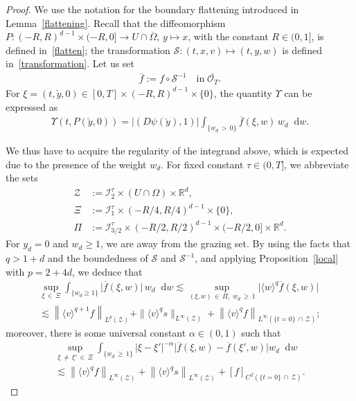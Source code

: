\documentclass[AHL,Unicode,longabstracts,published]{cedram}
\newcommand*{\dif}{\mathop{}\!\mathrm{d}}
\newcommand*\R {\mathbb{R}}
\newcommand*\I {\mathcal{I}}
\renewcommand*\SS {\mathcal{S}}
\newcommand*\Z {\mathcal{Z}}
\newcommand*\OO {\mathcal{O}}
\newcommand{\la}{\langle}
\newcommand{\ra}{\rangle}
\newcommand{\lv}{\langle v\rangle}
\begin{document}
\begin{proof}
We use the notation for the boundary flattening introduced in Lemma~\ref{flattening}. Recall that the diffeomorphism $P:(-R,R)^{d-1}\times(-R,0]\rightarrow U\cap\overline{\Omega}$, $y\mapsto x$, with the constant $R\in(0,1]$, is defined in~\eqref{flatten}; the transformation $\SS:(t,x,v)\mapsto(t,y,w)$ is defined in~\eqref{transformation}. Let us set
\begin{align*}
\overline{f}:=f\circ\SS^{-1} \quad\text{in}\; \overline{\OO_T}.
\end{align*}
For $\xi=(t,\check{y},0)\in [0,T]\times(-R,R)^{d-1}\times\{0\}$, the quantity $\Upsilon$ can be expressed as
\begin{align*}
\Upsilon(t,P(\check{y},0)) =|(D\psi(\check{y}),1)| \int_{\{w_d\,>\,0\}} \overline{f}(\xi,w)\, w_d \dif w.
\end{align*}

We thus have to acquire the regularity of the integrand above, which is expected due to the presence of the weight $w_d$. For fixed constant $\tau\in(0,T]$, we abbreviate the sets
\begin{align*}
\Z&:=\I_2^\tau\times(U\cap\Omega)\times\R^d,\\
\Xi&:=\I_1^\tau\times(-R/4,R/4)^{d-1}\times\{0\}, \\
\Pi&:=\I_{3/2}^\tau\times(-R/2,R/2)^{d-1}\times(-R/2,0]\times\R^d.
\end{align*}
For $y_d=0$ and $w_d\ge1$, we are away from the grazing set. By using the facts that $q>1+d$ and the boundedness of $\SS$ and $\SS^{-1}$, and applying Proposition~\ref{local} with $p=2+4d$, we deduce that
\begin{multline}\label{w10}
\sup_{\xi\,\in\,\Xi}\int_{\{w_d\ge1\}} \big|\overline{f}(\xi,w)\big|\, w_d \dif w
\lesssim \sup_{(\xi,w)\,\in\,\Pi,\;\! w_d\,\ge\,1}\big|\la w\ra^q\overline{f}(\xi,w)\big|\\
\lesssim \left\|\lv^{q+1}f\right\|_{L^p(\Z)} + \|\lv^{q}s\|_{L^\infty(\Z)} + \left\|\lv^{q}f\right\|_{L^\infty(\{t=0\}\,\cap\,\Z)};
\end{multline}
moreover, there is some universal constant $\alpha\in(0,1)$ such that
\begin{multline}\label{w11}
\sup_{\xi\,\neq\,\xi'\,\in\,\Xi}\int_{\{w_d\,\ge\,1\}} \left|\xi-\xi'\right|^{-\alpha}\big|\overline{f}(\xi,w)-\overline{f}(\xi',w)\big| w_d \dif w\\
\lesssim \left\|\lv^{q}f\right\|_{L^\infty(\Z)} + \left\|\lv^{q}s\right\|_{L^\infty(\Z)} + [f]_{C^\beta(\{t=0\}\,\cap\,\Z)}.
\end{multline}


\end{proof}
\end{document}
